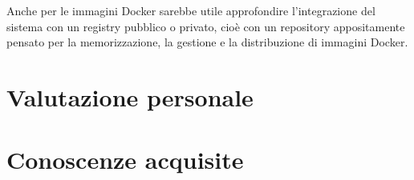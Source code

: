 Anche per le immagini Docker sarebbe utile approfondire l'integrazione del sistema con un \gls{registry} pubblico o privato, cioè con un repository appositamente pensato per la memorizzazione, la gestione e la distribuzione di immagini Docker.


\section{Valutazione personale}

\section{Conoscenze acquisite}
